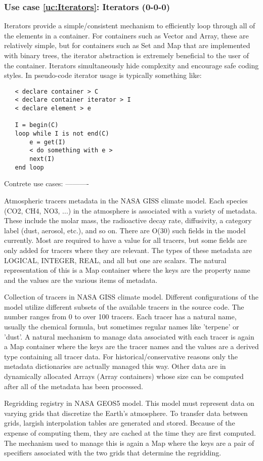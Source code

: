 \documentclass{article}
\newcounter{usecase}
\newcommand{\newusecase}[2]{
\refstepcounter{usecase}\label{uc:#1}
\subsubsection{Use case \ref{uc:#1}: #1 (#2)}}
\begin{document}
\newusecase{Iterators}{0-0-0}
Iterators provide a simple/consistent mechanism to efficiently loop through all of the elements in a container.  For   containers such as Vector and Array, these are relatively simple, but for containers such as Set and Map that are implemented with binary trees, the iterator abstraction is extremely beneficial to the user of the container.  Iterators simultaneously hide complexity and encourage safe coding styles.  In pseudo-code iterator usage is typically something like:

\begin{lstlisting}
   < declare container > C
   < declare container iterator > I
   < declare element > e

   I = begin(C)
   loop while I is not end(C)
       e = get(I)
       < do something with e >
       next(I)
   end loop
\end{lstlisting}    


Contrete use cases:
----------

Atmospheric tracers metadata in the NASA GISS climate model.  Each species (CO2, CH4, NO3, ...) in the atmosphere is associated with a variety of metadata.  These include the molar mass, the radioactive decay rate, diffusivity, a category label (dust, aerosol, etc.),   and so on.  There are O(30) such fields in the model currently.   Most are required to have a value for all tracers, but some fields   are only added for tracers where they are relevant.  The types of   these metadata are LOGICAL, INTEGER, REAL, and all but one are   scalars.  The natural representation of this is a Map container
   where the keys are the property name and the values are the various   items of metadata.

Collection of tracers in NASA GISS climate model.  Different   configurations of the model utilize different subsets of the   available tracers in the source code.  The number ranges from 0 to   over 100 tracers.  Each tracer has a natural name, usually the   chemical formula, but sometimes regular names like 'terpene' or   'dust'.  A natural mechanism to manage data associated with each
   tracer is again a Map container where the keys are the tracer names   and the values are a derived type containing all tracer data.  For   historical/conservative reasons only the metadata dictionaries are   actually managed this way.  Other data are in dynamically allocated
   Arrays (Array containers) whose size can be computed after all of   the metadata has been processed.

Regridding registry in NASA GEOS5 model.  This model must represent   data on varying grids that discretize the Earth's atmosphere.  To   transfer data between grids, largish interpolation tables are
   generated and stored.  Because of the expense of computing them,   they are cached at the time they are first computed.  The mechanism   used to manage this is again a Map where the keys are a pair of
   specifiers associated with the two grids that determine the   regridding.
\end{document}
